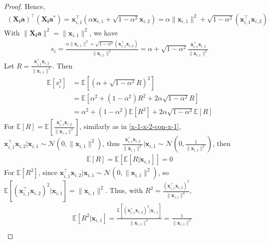 \documentclass{article}
\theoremstyle{plain}
\theoremstyle{definition}
\theoremstyle{remark}
\begin{document}
\begin{proof}
Hence,
\begin{align}
(\mathbf{X_i}\mathbf{a})^\top(\mathbf{X_i}\mathbf{a}^*)  = \mathbf{x}_{i,1}^\top (\alpha \mathbf{x}_{i,1} + \sqrt{1-\alpha^2} \mathbf{x}_{i,2}) = \alpha \| \mathbf{x}_{i,1} \|^2 + \sqrt{1-\alpha^2} (\mathbf{x}_{i,1}^\top \mathbf{x}_{i,2}) \label{x-i-1-top-x-i-a-star}
\end{align}
With $\| \mathbf{X_i}\mathbf{a} \|^2 = \| \mathbf{x}_{i,1}\|^2$, we have
\begin{align}
    s_i = \frac{\alpha \| \mathbf{x}_{i,1} \|^2 + \sqrt{1-\alpha^2} (\mathbf{x}_{i,1}^\top \mathbf{x}_{i,2})}{\| \mathbf{x}_{i,1}\|^2}=\alpha + \sqrt{1-\alpha^2} \frac{\mathbf{x}_{i,1}^\top \mathbf{x}_{i,2}}{\| \mathbf{x}_{i,1}\|^2} \label{s-i}
\end{align}
Let $R = \frac{\mathbf{x}_{i,1}^\top \mathbf{x}_{i,2}}{\| \mathbf{x}_{i,1}\|^2}$. Then 
\begin{align}
    \mathbb{E}\left[ s_i^2 \right] & = \mathbb{E}\left[ \left( \alpha + \sqrt{1-\alpha^2} R\right)^2 \right]\\
    & =  \mathbb{E}\left[ \alpha^2 + (1-\alpha^2)R^2+ 2\alpha\sqrt{1-\alpha^2} R\right] \\
    & = \alpha^2+ (1-\alpha^2) \mathbb{E}\left[ R^2 \right] +2\alpha\sqrt{1-\alpha^2} \mathbb{E}\left[ R \right] \label{E-s-i-square}
\end{align}
For $\mathbb{E}\left[ R \right]= \mathbb{E}\left[ \frac{\mathbf{x}_{i,1}^\top \mathbf{x}_{i,2}}{\| \mathbf{x}_{i,1}\|^2} \right]$, similarly as in \eqref{x-1-x-2-con-x-1}, $\mathbf{x}_{i,1}^\top \mathbf{x}_{i,2}| \mathbf{x}_{i,1} \sim \mathcal{N}(0, \| \mathbf{x}_{i,1}\|^2)$, thus $\frac{\mathbf{x}_{i,1}^\top \mathbf{x}_{i,2}}{\| \mathbf{x}_{i,1}\|^2} |\mathbf{x}_{i,1} \sim  \mathcal{N}(0, \frac{1}{\| \mathbf{x}_{i,1}\|^2})$, then 
\begin{align}
    \mathbb{E}\left[ R \right]=\mathbb{E}\left[ \mathbb{E}\left[ R | \mathbf{x}_{i,1} \right] \right] =0
\end{align}
For $\mathbb{E}\left[ R^2 \right]$, since $\mathbf{x}_{i,1}^\top \mathbf{x}_{i,2}| \mathbf{x}_{i,1} \sim \mathcal{N}(0, \| \mathbf{x}_{i,1}\|^2)$, so $\mathbb{E}\left[  (\mathbf{x}_{i,1}^\top \mathbf{x}_{i,2})^2 |\mathbf{x}_{i,1} \right]=\| \mathbf{x}_{i,1}\|^2$. Thus, with $R^2 = \frac{(\mathbf{x}_{i,1}^\top \mathbf{x}_{i,2})^2}{\| \mathbf{x}_{i,1}\|^4}$, 
\begin{align}
   &\mathbb{E}\left[ R^2 | \mathbf{x}_{i,1} \right]= \frac{\mathbb{E}\left[  (\mathbf{x}_{i,1}^\top \mathbf{x}_{i,2})^2 |\mathbf{x}_{i,1} \right]}{\| \mathbf{x}_{i,1}\|^4} = \frac{1}{\| \mathbf{x}_{i,1}\|^2} \\

\end{align}
\end{proof}
\end{document}
